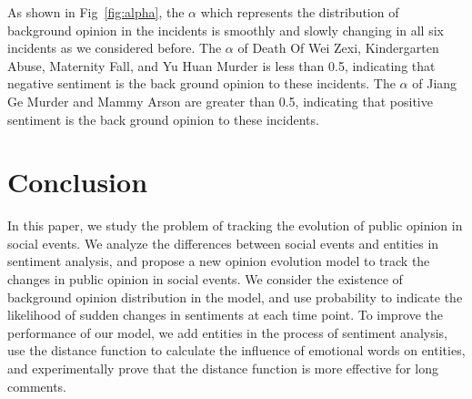 \documentclass[runningheads]{llncs}
\begin{document}
As shown in Fig~\ref{fig:alpha}, the $\alpha$ which represents the distribution of background opinion in the incidents is smoothly and slowly changing in all six incidents as we considered before. The $\alpha$ of Death Of Wei Zexi, Kindergarten Abuse, Maternity Fall, and Yu Huan Murder is less than 0.5, indicating that negative sentiment is the back ground opinion to these incidents. The $\alpha$ of Jiang Ge Murder and Mammy Arson are greater than 0.5, indicating that positive sentiment is the back ground opinion to these incidents.











 

\section{Conclusion}\label{sec:conclusion}
In this paper, we study the problem of tracking the evolution of public opinion in social events. We analyze the differences between social events and entities in sentiment analysis, and propose a new opinion evolution model to track the changes in public opinion in social events. We consider the existence of background opinion distribution in the model, and use probability to indicate the likelihood of sudden changes in sentiments at each time point. To improve the performance of our model, we add entities in the process of sentiment analysis, use the distance function to calculate the influence of emotional words on entities, and experimentally prove that the distance function is more effective for long comments.
\end{document}
